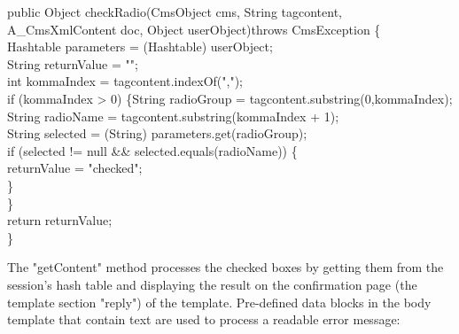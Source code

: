 \begin{java}
public Object checkRadio(CmsObject cms, String tagcontent,\\
A\_CmsXmlContent doc, Object userObject)throws CmsException \{\\
\jtaba        Hashtable parameters = (Hashtable) userObject;\\
\jtaba        String returnValue = "";\\
\jtaba        int kommaIndex = tagcontent.indexOf(",");\\
\jtaba        if (kommaIndex > 0) \{String radioGroup = tagcontent.substring(0,kommaIndex);\\
\jtabb                String radioName = tagcontent.substring(kommaIndex + 1);\\
\jtabb                String selected = (String) parameters.get(radioGroup);\\
\jtabb                if (selected != null \&\& selected.equals(radioName)) \{\\
\jtabc                        returnValue = "checked";\\
\jtabb                \}\\
\jtaba        \}\\
\jtaba        return returnValue;\\
\}\\
\end{java}

The {\meth "getContent"} method processes the checked boxes by getting them from
the session's hash table and displaying the result on the confirmation
page (the template section  {\name "reply")} of the template. Pre-defined data
blocks in the body template that contain text are used to process a
readable error message:

